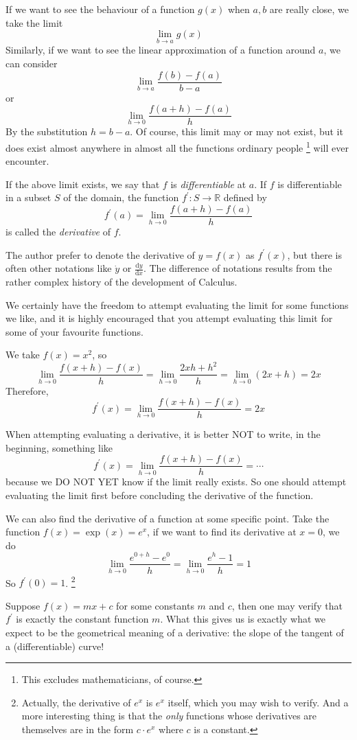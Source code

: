 If we want to see the behaviour of a function $g(x)$ when $a,b$ are really close, we take the limit
$$\lim_{b\to a}g(x)$$
Similarly, if we want to see the linear approximation of a function around $a$, we can consider 
$$\lim_{b\to a}\frac{f(b)-f(a)}{b-a}$$
or
$$\lim_{h\to 0}\frac{f(a+h)-f(a)}{h}$$
By the substitution $h=b-a$. Of course, this limit may or may not exist, but it does exist almost anywhere in almost all the functions ordinary people
\footnote{This excludes mathematicians, of course.}
will ever encounter.
\begin{definition}
    If the above limit exists, we say that $f$ is \textit{differentiable} at $a$.
    If $f$ is differentiable in a subset $S$ of the domain, the function $f^\prime:S\to\mathbb R$ defined by 
    $$f^\prime(a)=\lim_{h\to 0}\frac{f(a+h)-f(a)}{h}$$
    is called the \textit{derivative} of $f$.
\end{definition}
\begin{remark}
    The author prefer to denote the derivative of $y=f(x)$ as $f^\prime(x)$, but there is often other notations like $\dot{y}$ or $\frac{\mathrm dy}{\mathrm dx}$.
    The difference of notations results from the rather complex history of the development of Calculus.
\end{remark}
We certainly have the freedom to attempt evaluating the limit for some functions we like, and it is highly encouraged that you attempt evaluating this limit for some of your favourite functions.
\begin{example}
    We take $f(x)=x^2$, so
    $$\lim_{h\to0}\frac{f(x+h)-f(x)}{h}=\lim_{h\to0}\frac{2xh+h^2}{h}=\lim_{h\to0}(2x+h)=2x$$
    Therefore,
    $$f^\prime(x)=\lim_{h\to0}\frac{f(x+h)-f(x)}{h}=2x$$
\end{example}
\begin{remark}
    When attempting evaluating a derivative, it is better NOT to write, in the beginning, something like
    $$f^\prime(x)=\lim_{h\to0}\frac{f(x+h)-f(x)}{h}=\cdots$$
    because we DO NOT YET know if the limit really exists. So one should attempt evaluating the limit first before concluding the derivative of the function.
\end{remark}
\begin{example}
    We can also find the derivative of a function at some specific point. Take the function $f(x)=\exp(x)=e^x$, if we want to find its derivative at $x=0$, we do
    $$\lim_{h\to0}\frac{e^{0+h}-e^0}{h}=\lim_{h\to0}\frac{e^h-1}{h}=1$$
    So $f^\prime(0)=1$.
    \footnote{Actually, the derivative of $e^x$ is $e^x$ itself, which you may wish to verify. And a more interesting thing is that the \textit{only} functions whose derivatives are themselves are in the form $c\cdot e^x$ where $c$ is a constant.}
\end{example}
Suppose $f(x)=mx+c$ for some constants $m$ and $c$, then one may verify that $f^\prime$ is exactly the constant function $m$. What this gives us is exactly what we expect to be the geometrical meaning of a derivative: the slope of the tangent of a (differentiable) curve!